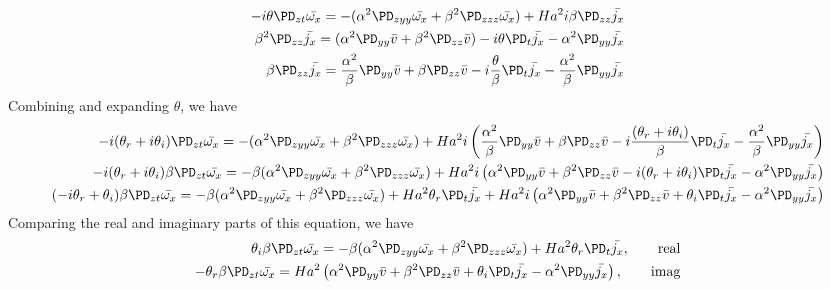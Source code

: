 \documentclass[11pt]{article}
\begin{document}
\begin{equation}\begin{aligned}
-i\theta \PD_{zt} \bar{\omega_x} = - (\alpha^2 \PD_{zyy} \bar{\omega_x} + \beta^2 \PD_{zzz} \bar{\omega_x}) + Ha^2 i \beta \PD_{zz} \bar{j_x} \\
\beta^2 \PD_{zz} \bar{j_x} = (\alpha^2 \PD_{yy} \bar{v} + \beta^2 \PD_{zz} \bar{v}) - i\theta \PD_t \bar{j_x} - \alpha^2 \PD_{yy} \bar{j_x} \\
\beta \PD_{zz} \bar{j_x} = \frac{\alpha^2}{\beta} \PD_{yy} \bar{v} + \beta \PD_{zz} \bar{v} - i \frac{\theta}{\beta} \PD_t \bar{j_x} - \frac{\alpha^2}{\beta} \PD_{yy} \bar{j_x} \\
\end{aligned}\end{equation}
Combining and expanding $\theta$, we have
\begin{equation}\begin{aligned}
-i(\theta_r + i\theta_i) \PD_{zt} \bar{\omega_x} = - (\alpha^2 \PD_{zyy} \bar{\omega_x} + \beta^2 \PD_{zzz} \bar{\omega_x}) + Ha^2 i \left( \frac{\alpha^2}{\beta} \PD_{yy} \bar{v} + \beta \PD_{zz} \bar{v} - i \frac{(\theta_r + i\theta_i)}{\beta} \PD_t \bar{j_x} - \frac{\alpha^2}{\beta} \PD_{yy} \bar{j_x} \right) \\
-i(\theta_r + i\theta_i) \beta \PD_{zt} \bar{\omega_x} = - \beta (\alpha^2 \PD_{zyy} \bar{\omega_x} + \beta^2 \PD_{zzz} \bar{\omega_x}) + Ha^2 i \left( \alpha^2 \PD_{yy} \bar{v} + \beta^2 \PD_{zz} \bar{v} - i (\theta_r + i\theta_i) \PD_t \bar{j_x} - \alpha^2 \PD_{yy} \bar{j_x} \right) \\
(-i\theta_r + \theta_i) \beta \PD_{zt} \bar{\omega_x} = - \beta (\alpha^2 \PD_{zyy} \bar{\omega_x} + \beta^2 \PD_{zzz} \bar{\omega_x}) + Ha^2 \theta_r \PD_t \bar{j_x} + Ha^2 i \left( \alpha^2 \PD_{yy} \bar{v} + \beta^2 \PD_{zz} \bar{v} + \theta_i \PD_t \bar{j_x} - \alpha^2 \PD_{yy} \bar{j_x} \right) \\
\end{aligned}\end{equation}
Comparing the real and imaginary parts of this equation, we have
\begin{equation}\begin{aligned}
 \theta_i \beta \PD_{zt} \bar{\omega_x} = - \beta (\alpha^2 \PD_{zyy} \bar{\omega_x} + \beta^2 \PD_{zzz} \bar{\omega_x}) + Ha^2 \theta_r \PD_t \bar{j_x}, \qquad \text{real} \\
-\theta_r \beta \PD_{zt} \bar{\omega_x} = Ha^2 \left( \alpha^2 \PD_{yy} \bar{v} + \beta^2 \PD_{zz} \bar{v} + \theta_i \PD_t \bar{j_x} - \alpha^2 \PD_{yy} \bar{j_x} \right), \qquad \text{imag} \\
\end{aligned}\end{equation}
\end{document}
